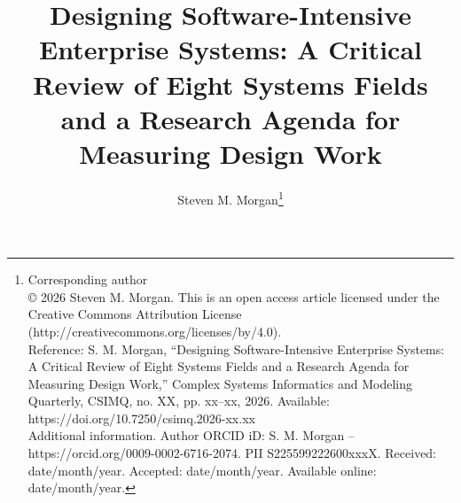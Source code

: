 \documentclass{csimq}
\begin{document}
\title{Designing Software-Intensive Enterprise Systems: A Critical Review of Eight Systems Fields and a Research Agenda for Measuring Design Work}

\author{Steven M. Morgan\protect\footnote[1]{Corresponding author\vspace{0.6em} \\%
\copyright{} 2026 Steven M. Morgan. This is an open access article licensed under the Creative Commons Attribution License (http://creativecommons.org/licenses/by/4.0).\vspace{0.6em} \\%
%
Reference: S. M. Morgan, ``Designing Software-Intensive Enterprise Systems: A Critical Review of Eight Systems Fields and a Research Agenda for Measuring Design Work,'' Complex Systems Informatics and Modeling Quarterly, CSIMQ, no. XX, pp. xx--xx, 2026. Available: https://doi.org/10.7250/csimq.2026-xx.xx \vspace{0.6em} \\%
%
Additional information. Author ORCID iD: S. M. Morgan -- https://orcid.org/0009-0002-6716-2074. PII S225599222600xxxX. Received: date/month/year. Accepted: date/month/year. Available online: date/month/year.}%
}


\maketitle
{}
\end{document}
